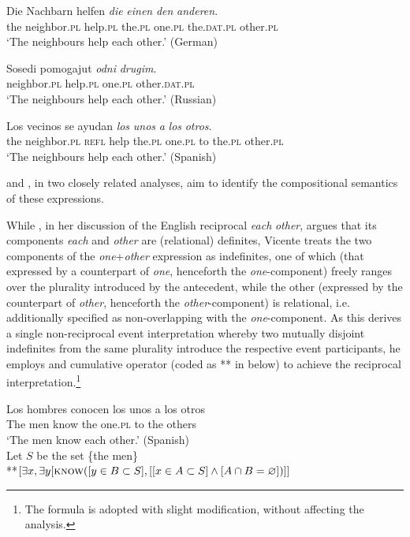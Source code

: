 \documentclass[output=paper,colorlinks,citecolor=brown]{langscibook}
\begin{document}
\ea\label{ex:Nachbarn1-D}
\gll Die Nachbarn helfen \textit{die} \textit{einen} \textit{den} \textit{anderen}. \\
 the neighbor.\textsc{pl} help.\textsc{pl} the.\textsc{pl} one.\textsc{pl} the.\textsc{dat.\textsc{pl}} other.\textsc{pl}\\
\glt`The neighbours help each other.' \hfill (German)
\z

\ea\label{ex:Nachbarn1-R}
\gll Sosedi pomogajut \textit{odni} \textit{drugim}.\\
neighbor.\textsc{pl} help.\textsc{pl} one.\textsc{pl} other.\textsc{dat.\textsc{pl}}\\
\glt`The neighbours help each other.' \hfill (Russian)
\z

\ea\label{ex:Nachbarn1-E}
\gll Los vecinos se ayudan \textit{los} \textit{unos} \textit{a} \textit{los} \textit{otros}.\\
 the neighbor.\textsc{pl} \textsc{refl} help the.\textsc{pl} one.\textsc{pl} to the.\textsc{pl} other.\textsc{pl}\\
\glt`The neighbours help each other.' \hfill (Spanish)
\z

\noindent \citet{v10} and \citet{z14}, in two closely related analyses, aim to identify the compositional semantics of these expressions. 

While \citet{b01}, in her discussion of the English reciprocal \textit{each} \textit{other}, argues that its components \textit{each} and \textit{other} are (relational) definites, Vicente treats the two components of the \textit{one}+\textit{other} expression as indefinites, one of which (that expressed by a counterpart of \textit{one}, henceforth the \textit{one}-component) freely ranges over the plurality introduced by the antecedent, while the other (expressed by the counterpart of \textit{other}, henceforth the \textit{other}-component) is relational, i.e. additionally specified as non-overlapping with the \textit{one}-component. As this derives a single non-reciprocal event interpretation whereby two mutually disjoint indefinites from the same plurality introduce the respective event participants, he employs  and  cumulative operator (coded as ** in  below) to achieve the reciprocal interpretation.\footnote{The formula is adopted with slight modification, without affecting the analysis.}

\ea\label{ex:Hombres}
\ea
\gll Los hombres conocen los unos a los otros\\
The men know the one.\textsc{pl} to the others\\
\glt `The men know each other.' \hfill (Spanish)\\
\ex
Let $S$ be the set \{the men\}\\
**$[\exists x, \exists y [\textsc{know}([y \in B \subset S], [[x \in A \subset S] \wedge [A \cap B = \varnothing])]]$ 
\end{document}
